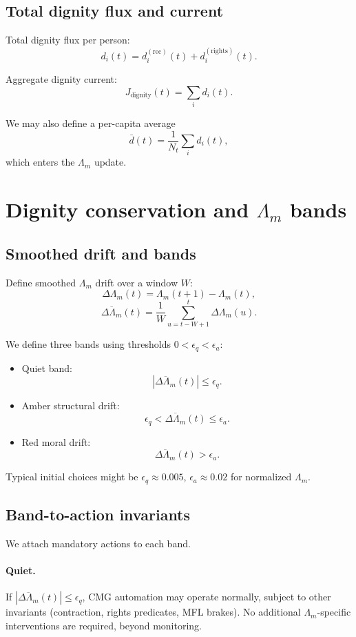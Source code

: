 \documentclass[11pt]{article}
\begin{document}
\subsection{Total dignity flux and current}

Total dignity flux per person:
\[
d_i(t) = d_i^{(\text{rec})}(t) + d_i^{(\text{rights})}(t).
\]

Aggregate dignity current:
\[
J_{\text{dignity}}(t) = \sum_{i} d_i(t).
\]

We may also define a per-capita average
\[
\bar{d}(t) = \frac{1}{N_t}\sum_i d_i(t),
\]
which enters the \(\Lambda_m\) update.

\section{Dignity conservation and \texorpdfstring{\(\Lambda_m\)}{Lambda\_m} bands}

\subsection{Smoothed drift and bands}

Define smoothed \(\Lambda_m\) drift over a window \(W\):
\[
\Delta \Lambda_m(t) = \Lambda_m(t+1) - \Lambda_m(t),
\]
\[
\overline{\Delta \Lambda_m}(t) = \frac{1}{W}\sum_{u=t-W+1}^{t} \Delta \Lambda_m(u).
\]

We define three bands using thresholds \(0 < \epsilon_q < \epsilon_a\):

\begin{itemize}[leftmargin=*]
  \item Quiet band:
  \[
  |\overline{\Delta \Lambda_m}(t)| \le \epsilon_q.
  \]
  \item Amber structural drift:
  \[
  \epsilon_q < \overline{\Delta \Lambda_m}(t) \le \epsilon_a.
  \]
  \item Red moral drift:
  \[
  \overline{\Delta \Lambda_m}(t) > \epsilon_a.
  \]
\end{itemize}

Typical initial choices might be \(\epsilon_q \approx 0.005\), \(\epsilon_a \approx 0.02\) for normalized \(\Lambda_m\).

\subsection{Band-to-action invariants}

We attach mandatory actions to each band.

\paragraph{Quiet.}
If \(|\overline{\Delta \Lambda_m}(t)| \le \epsilon_q\), CMG automation may operate normally, subject to other invariants (contraction, rights predicates, MFL brakes).
No additional \(\Lambda_m\)-specific interventions are required, beyond monitoring.
\end{document}
